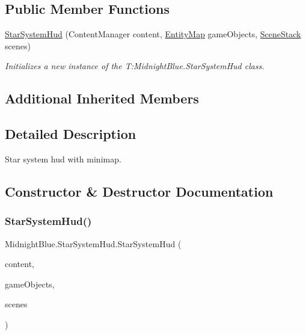 \subsection*{Public Member Functions}
\begin{DoxyCompactItemize}
\item 
\hyperlink{class_midnight_blue_1_1_star_system_hud_acfe0b74ff1b0013956511de5ab3d38b3}{Star\+System\+Hud} (Content\+Manager content, \hyperlink{class_midnight_blue_1_1_engine_1_1_entity_component_1_1_entity_map}{Entity\+Map} game\+Objects, \hyperlink{class_midnight_blue_1_1_engine_1_1_scenes_1_1_scene_stack}{Scene\+Stack} scenes)
\begin{DoxyCompactList}\small\item\em Initializes a new instance of the T\+:\+Midnight\+Blue.\+Star\+System\+Hud class. \end{DoxyCompactList}\end{DoxyCompactItemize}
\subsection*{Additional Inherited Members}


\subsection{Detailed Description}
Star system hud with minimap. 



\subsection{Constructor \& Destructor Documentation}
\hypertarget{class_midnight_blue_1_1_star_system_hud_acfe0b74ff1b0013956511de5ab3d38b3}{}\label{class_midnight_blue_1_1_star_system_hud_acfe0b74ff1b0013956511de5ab3d38b3} 
\subsubsection{\texorpdfstring{Star\+System\+Hud()}{StarSystemHud()}}
{\footnotesize\ttfamily Midnight\+Blue.\+Star\+System\+Hud.\+Star\+System\+Hud (\begin{DoxyParamCaption}\item[{Content\+Manager}]{content,  }\item[{\hyperlink{class_midnight_blue_1_1_engine_1_1_entity_component_1_1_entity_map}{Entity\+Map}}]{game\+Objects,  }\item[{\hyperlink{class_midnight_blue_1_1_engine_1_1_scenes_1_1_scene_stack}{Scene\+Stack}}]{scenes }\end{DoxyParamCaption})\hspace{0.3cm}{\ttfamily [inline]}}




